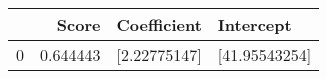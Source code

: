 \begin{tabular}{lrll}
\toprule
 & Score & Coefficient & Intercept \\
\midrule
0 & 0.644443 & [2.22775147] & [41.95543254] \\
\bottomrule
\end{tabular}
